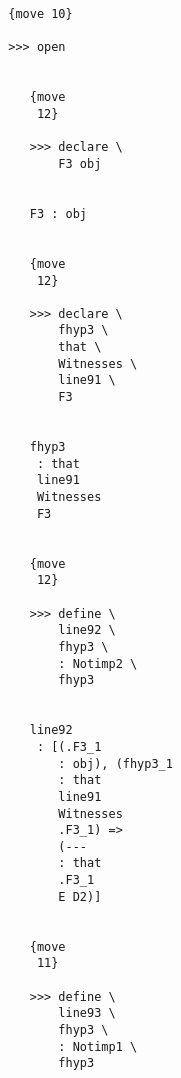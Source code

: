 \documentclass[12pt]{article}
\begin{document}
\begin{verbatim}
                                 {move 10}

                                 >>> open


                                    {move 
                                     12}

                                    >>> declare \
                                        F3 obj


                                    F3 : obj


                                    {move 
                                     12}

                                    >>> declare \
                                        fhyp3 \
                                        that \
                                        Witnesses \
                                        line91 \
                                        F3


                                    fhyp3 
                                     : that 
                                     line91 
                                     Witnesses 
                                     F3


                                    {move 
                                     12}

                                    >>> define \
                                        line92 \
                                        fhyp3 \
                                        : Notimp2 \
                                        fhyp3


                                    line92 
                                     : [(.F3_1 
                                        : obj), (fhyp3_1 
                                        : that 
                                        line91 
                                        Witnesses 
                                        .F3_1) => 
                                        (--- 
                                        : that 
                                        .F3_1 
                                        E D2)]


                                    {move 
                                     11}

                                    >>> define \
                                        line93 \
                                        fhyp3 \
                                        : Notimp1 \
                                        fhyp3



\end{verbatim}
\end{document}
